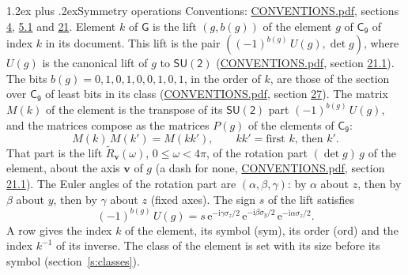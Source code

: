 \documentclass[10pt,a4paper]{article}
\makeatletter
\renewcommand\section{\@startsection{section}{1}{\z@}{-3ex plus -1ex minus -.2ex}%
  {1.2ex plus .2ex}{\normalfont\large\sffamily\bfseries\color{parttitle}}}
\numberwithin{equation}{section}
\newcommand{\grp}[1]{\mathsf{#1}}
\newcommand{\vv}{\mathbf{v}}
\newcommand{\iunit}{\mathrm{i}}
\newcommand{\expe}{\mathrm{e}}
\newcommand{\lift}[1]{\tilde{#1}}
\newcommand{\pauli}[1]{\sigma_{#1}}
\makeatother
\begin{document}
\section{Symmetry operations}\label{s:elements}
Conventions: \href{../../CONVENTIONS.pdf}{CONVENTIONS.pdf}, sections \href{../../../rotation/CONVENTIONS.pdf\#conv.4}{4}, \href{../../../rotation/CONVENTIONS.pdf\#conv.5.1}{5.1} and \href{../../CONVENTIONS.pdf\#conv.21}{21}.
\leavevmode\label{n:index.element}\label{n:element.g}\label{n:function.section}Element $k$ of $\grp{G}$ is the lift $(g, b(g))$ of the element $g$ of \href{../../../rotation/data/pdf/C9.pdf}{$\grp{C_{9}}$} of index $k$ in its document. This lift is the pair $((-1)^{b(g)}\,U(g), \det g)$, where $U(g)$ is the canonical lift of $g$ to $\grp{SU(2)}$ (\href{../../CONVENTIONS.pdf}{CONVENTIONS.pdf}, section \href{../../CONVENTIONS.pdf\#conv.21.1}{21.1}). The bits $b(g) = 0, 1, 0, 1, 0, 0, 1, 0, 1$, in the order of $k$, are those of the section over $\grp{C_{9}}$ of least bits in its class (\href{../../CONVENTIONS.pdf}{CONVENTIONS.pdf}, section \href{../../CONVENTIONS.pdf\#conv.27}{27}). \label{n:matrix.element.pin}\label{n:matrix.element}The matrix $M(k)$ of the element is the transpose of its $\grp{SU(2)}$ part $(-1)^{b(g)}\,U(g)$, and the matrices compose as the matrices $P(g)$ of the elements of $\grp{C_{9}}$:
\begin{equation}\label{e:mprod}M(k)\,M(k') = M(kk'),\qquad kk' = \text{first } k\text{, then } k'.\end{equation}
\leavevmode\label{n:angle.omega}\label{n:vector.axis}\label{n:vector.pole}That part is the lift $\lift{R}_{\vv}(\omega)$, $0 \le \omega < 4\pi$, of the rotation part $(\det g)\,g$ of the element, about the axis $\vv$ of $g$ (a dash for none, \href{../../CONVENTIONS.pdf}{CONVENTIONS.pdf}, section \href{../../CONVENTIONS.pdf\#conv.21.1}{21.1}). \label{n:angle.euler.alpha}\label{n:angle.euler.beta}\label{n:angle.euler.gamma}\label{n:vector.coordinates}The Euler angles of the rotation part are $(\alpha,\beta,\gamma)$: by $\alpha$ about $z$, then by $\beta$ about $y$, then by $\gamma$ about $z$ (fixed axes). \label{n:local.euler.sign}The sign $s$ of the lift satisfies
\begin{equation}\label{e:euler}(-1)^{b(g)}\,U(g) = s\,\expe^{-\iunit\gamma\pauli{z}/2}\,\expe^{-\iunit\beta\pauli{y}/2}\,\expe^{-\iunit\alpha\pauli{z}/2}.\end{equation}
\leavevmode\label{n:index.element.inverse}\label{n:head.sym}\label{n:head.ord}A row gives the index $k$ of the element, its symbol (sym), its order (ord) and the index $k^{-1}$ of its inverse. \label{n:head.class}The class of the element is set with its size before its symbol (section~\ref{s:classes}).
\end{document}
